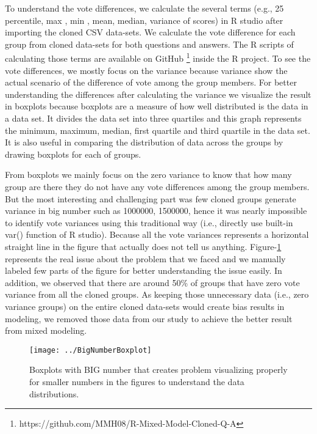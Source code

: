 \documentclass[conference]{IEEEtran}
\begin{document}
	To understand the vote differences, we calculate the several terms (e.g., 25 percentile, max , min , mean, median, variance of scores) in R studio after importing the cloned CSV data-sets. We calculate the vote difference for each group from cloned data-sets for both questions and answers. The R scripts of calculating those terms are available on GitHub \footnote{https://github.com/MMH08/R-Mixed-Model-Cloned-Q-A} inside the R project. To see the vote differences, we mostly focus on the variance because variance show the actual scenario of the difference of vote among the group members. For better understanding the differences after calculating the variance we visualize the result in boxplots because boxplots are a measure of how well distributed is the data in a data set. It divides the data set into three quartiles and this graph represents the minimum, maximum, median, first quartile and third quartile in the data set. It is also useful in comparing the distribution of data across the groups by drawing boxplots for each of groups.  
	
	
	From boxplots we mainly focus on the zero variance to know that how many group are there they do not have any vote differences among the group members. But the most interesting and challenging part was few cloned groups generate variance in big number such as 1000000, 1500000, hence it was nearly impossible to identify vote variances using this traditional way (i.e., directly use built-in var() function of R studio). Because all the vote variances represents a horizontal straight line in the figure that actually does not tell us anything. Figure-\ref{fig:bignumberboxplot} represents the real issue about the problem that we faced and we manually labeled few parts of the figure for better understanding the issue easily. In addition, we observed that there are around 50\% of groups that have zero vote variance from all the cloned groups. As keeping those unnecessary data (i.e., zero variance groups) on the entire cloned data-sets would create bias results in modeling, we removed those data from our study to achieve the better result from mixed modeling.
	
	\begin{figure}
		\centering
		\texttt{[image: ../BigNumberBoxplot]}
		\caption{Boxplots with BIG number that creates problem visualizing properly for smaller numbers in the figures to understand the data distributions.}
		\label{fig:bignumberboxplot}
	\end{figure}
	
\end{document}
